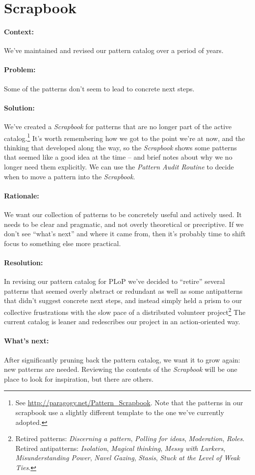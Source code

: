 \section{Scrapbook}

\paragraph{Context:} We've maintained and revised our pattern catalog over a period of years.
\paragraph{Problem:} Some of the patterns don't seem to lead to concrete next steps.
\paragraph{Solution:} We've created a \emph{Scrapbook} for patterns that are no longer part of the active catalog.\footnote{See \url{http://paragogy.net/Pattern_Scrapbook}.  Note that the patterns in our scrapbook use a slightly different template to the one we've currently adopted.}  It's worth remembering how we got to the point we're at now, and the thinking that developed along the way, so the \emph{Scrapbook} shows some patterns that seemed like a good idea at the time -- and brief notes about why we no longer need them explicitly.  We can use the \emph{Pattern Audit Routine} to decide when to move a pattern into the \emph{Scrapbook}.
\paragraph{Rationale:} We want our collection of patterns to be concretely useful and actively used.  It needs to be clear and pragmatic, and not overly theoretical or precriptive.  If we don't see ``what's next'' and where it came from, then it's probably time to shift focus to something else more practical.
\paragraph{Resolution:}  In revising our pattern catalog for PLoP we've decided to ``retire'' several patterns that seemed overly abstract or redundant as well as some antipatterns that didn't suggest concrete next steps, and instead simply held a prism to our collective frustrations with the slow pace of a distributed volunteer project\footnote{Retired patterns: \emph{Discerning a pattern}, \emph{Polling for ideas}, \emph{Moderation}, \emph{Roles}. Retired antipatterns: \emph{Isolation}, \emph{Magical thinking}, \emph{Messy with Lurkers}, \emph{Misunderstanding Power}, \emph{Navel Gazing}, \emph{Stasis}, \emph{Stuck at the Level of Weak Ties}.}  The current catalog is leaner and redescribes our project in an action-oriented way. 
\paragraph{What's next:} After significantly pruning back the pattern catalog, we want it to grow again: new patterns are needed.  Reviewing the contents of the \emph{Scrapbook} will be one place to look for inspiration, but there are others.

